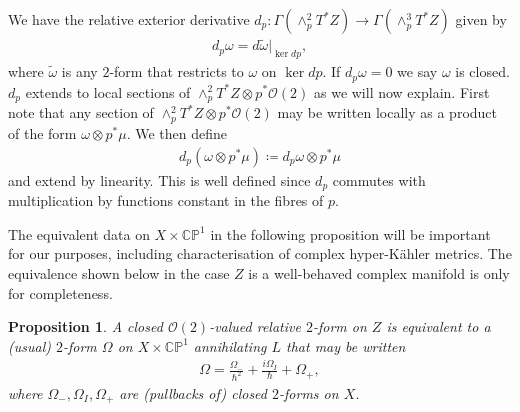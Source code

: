 \documentclass[a4paper,12pt,reqno]{amsart}
\newcounter{counter2}
\numberwithin{equation}{section}
\numberwithin{counter2}{section}
\newcounter{counter3}
\newtheorem{prop}[counter2]{Proposition}
\begin{document}
  We have the relative exterior derivative $d_p: \Gamma(\wedge^2_pT^*Z) \to  \Gamma(\wedge^3_pT^*Z)$ given by 
  \begin{align}
  d_p\omega = d\tilde{\omega}|_{\ker dp},  
  \end{align}
   where $\tilde{\omega}$ is any $2$-form that restricts to $\omega$ on $\operatorname{ker} dp$.  If $d_p\omega = 0$ we say $\omega$ is closed.  $d_p$ extends to local sections of $\wedge^2_pT^* Z \otimes p^*\mathcal{O}(2)$ as we will now explain.  First note that any section of $\wedge^2_p T^*Z \otimes p^*\mathcal{O}(2)$ may be written locally as a product of the form $\omega \otimes p^*\mu$.  We then define
   \begin{align}\label{dp_extension}
   d_p(\omega \otimes p^*\mu) \coloneqq d_p \omega \otimes p^* \mu 
   \end{align}
   and extend by linearity.  
   This is well defined since $d_p$ commutes with multiplication by functions constant in the fibres of $p$.  \par
      The equivalent data on $X \times \mathbb{CP}^1$ in the following proposition will be important for our purposes,  including characterisation of complex hyper-K\"ahler metrics.  The equivalence shown below in the case $Z$ is a well-behaved complex manifold is only for completeness.  
  \begin{prop}\label{practical_definition_twistor_form}
  A closed $\mathcal{O}(2)$-valued relative $2$-form on $Z$ is equivalent to a (usual) $2$-form $\Omega$ on $X \times \mathbb{CP}^1$ annihilating $L$ 
   that may be written
  \begin{align}\label{practical_definition_formula}
\Omega =  \frac{\Omega_-}{\hbar^2} + \frac{i\Omega_{I}}{\hbar} + \Omega_{+},  
  \end{align}
  where $\Omega_-,\Omega_{I},\Omega_{+}$ are (pullbacks of) closed $2$-forms on $X$. 
  \end{prop}
\end{document}
